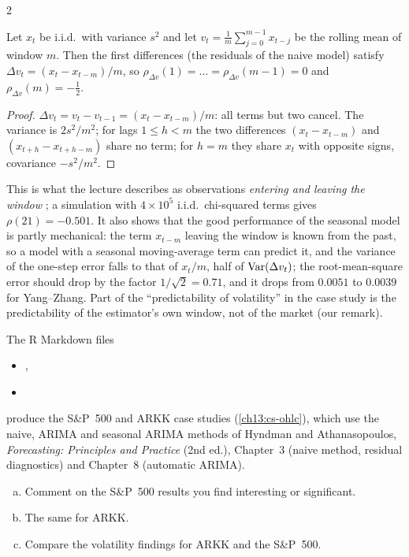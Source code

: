 \begin{paracol}{2}
\begin{secondary}
\begin{proposition}\label{ch13:prop-lag21}
Let $x_t$ be i.i.d.\ with variance $s^2$ and let $v_t=\frac1m\sum_{j=0}^{m-1}x_{t-j}$ be the rolling mean of window $m$. Then the first differences (the
residuals of the naive model) satisfy $\Delta v_t=(x_t-x_{t-m})/m$, so
$\rho_{\Delta v}(1)=\dots=\rho_{\Delta v}(m-1)=0$ and $\rho_{\Delta v}(m)=-\tfrac12$.
\end{proposition}
\begin{proof}
$\Delta v_t=v_t-v_{t-1}=(x_t-x_{t-m})/m$: all terms but two cancel. The variance is $2s^2/m^2$; for lags $1\le h<m$ the two
differences $(x_t-x_{t-m})$ and $(x_{t+h}-x_{t+h-m})$ share no term; for $h=m$ they share $x_t$ with opposite signs, covariance $-s^2/m^2$.
\end{proof}
This is what the lecture describes as observations \emph{entering and leaving the window} ; a simulation with $4\times10^5$
i.i.d.\ chi-squared terms gives $\rho(21)=-0.501$. It also shows that the good performance of the seasonal model is partly mechanical: the term $x_{t-m}$ leaving the window is known
from the past, so a model with a seasonal moving-average term can predict it, and the variance of the one-step error falls to that of $x_t/m$,
half of $\operatorname{Var}(\Delta v_t)$; the root-mean-square error should drop by the factor $1/\sqrt2=0.71$, and it drops from $0.0051$ to $0.0039$ for Yang--Zhang. Part of the
``predictability of volatility'' in the case study is the predictability of the estimator's own window, not of the market (our remark).
\end{secondary}

\begin{exercise}\label{ch13:ex-ps5-p4}
The R Markdown files
\begin{itemize}\item {}, \item {}\end{itemize}
produce the S\&P~500 and ARKK case studies (\cref{ch13:cs-ohlc}), which use the naive, ARIMA and seasonal ARIMA methods of Hyndman and Athanasopoulos,
\emph{Forecasting: Principles and Practice} (2nd ed.), Chapter~3 (naive method, residual diagnostics) and Chapter~8 (automatic ARIMA).
\begin{enumerate}[(a)]
  \item Comment on the S\&P~500 results you find interesting or significant.
  \item The same for ARKK.
  \item Compare the volatility findings for ARKK and the S\&P~500.
\end{enumerate}
\end{exercise}


\end{paracol}
